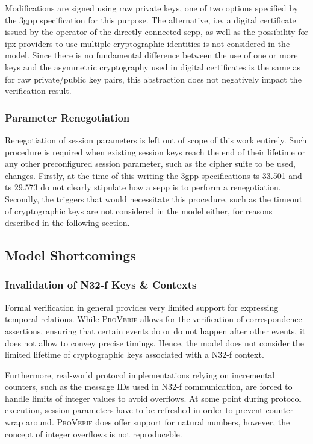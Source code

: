 Modifications are signed using raw private keys, one of two options specified by the \gls{3gpp} specification for this purpose.
The alternative, i.e. a digital certificate issued by the operator of the directly connected \gls{sepp}, as well as the possibility for \gls{ipx} providers to use multiple cryptographic identities is not considered in the model.
Since there is no fundamental difference between the use of one or more keys and the asymmetric cryptography used in digital certificates is the same as for raw private/public key pairs, this abstraction does not negatively impact the verification result.

\subsubsection{Parameter Renegotiation}

Renegotiation of session parameters is left out of scope of this work entirely.
Such procedure is required when existing session keys reach the end of their lifetime or any other preconfigured session parameter, such as the cipher suite to be used, changes.
Firstly, at the time of this writing the \gls{3gpp} specifications \gls{ts} 33.501 and \gls{ts} 29.573 do not clearly stipulate how a \gls{sepp} is to perform a renegotiation.
Secondly, the triggers that would necessitate this procedure, such as the timeout of cryptographic keys are not considered in the model either, for reasons described in the following section.

\subsection{Model Shortcomings}

\subsubsection{Invalidation of N32-f Keys \& Contexts}

Formal verification in general provides very limited support for expressing temporal relations.
While \textsc{ProVerif} allows for the verification of correspondence assertions, ensuring that certain events do or do not happen after other events, it does not allow to convey precise timings.
Hence, the model does not consider the limited lifetime of cryptographic keys associated with a N32-f context.

Furthermore, real-world protocol implementations relying on incremental counters, such as the message IDs used in N32-f communication, are forced to handle limits of integer values to avoid overflows.
At some point during protocol execution, session parameters have to be refreshed in order to prevent counter wrap around.
\textsc{ProVerif} does offer support for natural numbers, however, the concept of integer overflows is not reproduceble.

